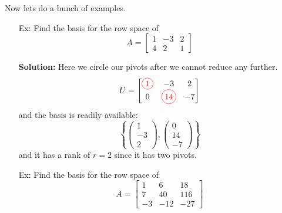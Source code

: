 \documentclass[reqno]{amsart}
\theoremstyle{definition}
\begin{document}
Now lets do a bunch of examples.

\begin{enumerate}

\item[Ex:  ]  Find the basis for the row space of
%
\begin{equation*}
A = \begin{bmatrix}
1 & -3 & 2\\
4 & 2 & 1
\end{bmatrix}
\end{equation*}

\textbf{Solution:  }
Here we circle our pivots after we cannot reduce any further.
%
\begin{equation*}
U = \begin{bmatrix}
\circled{1} & -3 & 2\\
0 & \circled{14} & -7
\end{bmatrix}
\end{equation*}
%
and the basis is readily available:
%
\begin{equation*}
\left\lbrace \begin{pmatrix}
1\\
-3\\
2
\end{pmatrix}, \begin{pmatrix}
0\\
14\\
-7
\end{pmatrix}\right\rbrace
\end{equation*}
%
and it has a rank of $r = 2$ since it has two pivots.

\item[Ex:  ]  Find the basis for the row space of
%
\begin{equation*}
A = \begin{bmatrix}
1 & 6 & 18\\
7 & 40 & 116\\
-3 & -12 & -27
\end{bmatrix}
\end{equation*}


\end{enumerate}
\end{document}

